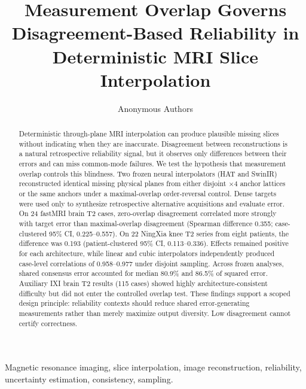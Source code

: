 \documentclass[journal,10pt]{IEEEtran}
\begin{document}
\title{Measurement Overlap Governs Disagreement-Based Reliability in Deterministic MRI Slice Interpolation}
\author{Anonymous Authors%
}
\maketitle

\begin{abstract}
Deterministic through-plane MRI interpolation can produce plausible missing slices without indicating when they are inaccurate. Disagreement between reconstructions is a natural retrospective reliability signal, but it observes only differences between their errors and can miss common-mode failures. We test the hypothesis that measurement overlap controls this blindness. Two frozen neural interpolators (HAT and SwinIR) reconstructed identical missing physical planes from either disjoint $\times4$ anchor lattices or the same anchors under a maximal-overlap order-reversal control. Dense targets were used only to synthesize retrospective alternative acquisitions and evaluate error. On 24 fastMRI brain T2 cases, zero-overlap disagreement correlated more strongly with target error than maximal-overlap disagreement (Spearman difference 0.355; case-clustered 95\% CI, 0.225--0.557). On 22 NingXia knee T2 series from eight patients, the difference was 0.193 (patient-clustered 95\% CI, 0.113--0.336). Effects remained positive for each architecture, while linear and cubic interpolators independently produced case-level correlations of 0.958--0.977 under disjoint sampling. Across frozen analyses, shared consensus error accounted for median 80.9\% and 86.5\% of squared error. Auxiliary IXI brain T2 results (115 cases) showed highly architecture-consistent difficulty but did not enter the controlled overlap test. These findings support a scoped design principle: reliability contexts should reduce shared error-generating measurements rather than merely maximize output diversity. Low disagreement cannot certify correctness.
\end{abstract}

\begin{IEEEkeywords}
Magnetic resonance imaging, slice interpolation, image reconstruction, reliability, uncertainty estimation, consistency, sampling.
\end{IEEEkeywords}
\end{document}
